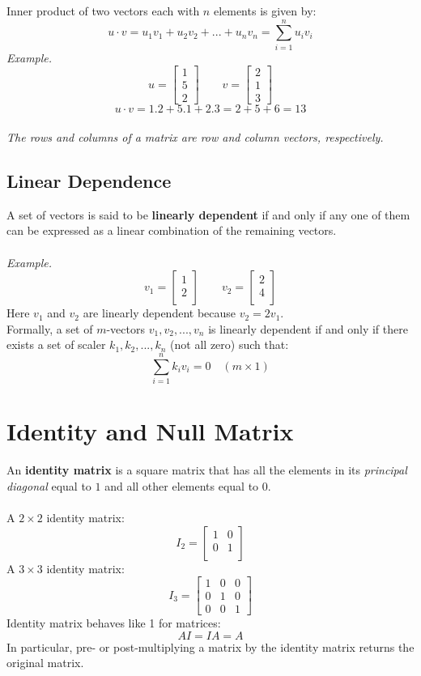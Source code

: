 \documentclass{./../Latex/handout}
\begin{document}
Inner product of two vectors each with $n$ elements is given by:
$$ u \cdot v = u_1 v_1 + u_2 v_2 +...+ u_n v_n = \sum_{i=1}^n u_i v_i $$ 
\textit{Example.} $$u = \begin{bmatrix} 1 \\ 5 \\ 2 \end{bmatrix} \quad \quad v = \begin{bmatrix} 2 \\ 1 \\ 3 \end{bmatrix}$$
$$ u \cdot v = 1.2 + 5.1 + 2.3 = 2+5+6=13 $$ \\
\textit{The rows and columns of a matrix are row and column vectors, respectively.}  

\subsection{Linear Dependence}

A set of vectors is said to be \textbf{linearly dependent} if and only if any one of them can be expressed as a linear combination of the remaining vectors. \\~\\
\textit{Example.}$$ v_1 =  \begin{bmatrix}
1\\
2 \\
\end{bmatrix} \quad \quad v_2 = \begin{bmatrix}
2\\
4 \\
\end{bmatrix}$$
Here $v_1$ and $v_2$ are linearly dependent because $v_2=2 v_1$.\\

Formally, a set of $m$-vectors $v_1, v_2, ...,v_n$ is {linearly dependent} if and only if there exists a set of scaler $k_1, k_2, ..., k_n$ (not all zero) such that:
$$ \sum_{i=1}^n k_i v_i = 0 \quad (m \times 1) $$ 


\section{Identity and Null Matrix}
An \textbf{identity matrix} is a square matrix that has all the elements in its \textit{principal diagonal} equal to $1$ and all other elements equal to $0$. \\~\\
A $2 \times 2$ identity matrix:
$$ I_2 = \begin{bmatrix}
1 & 0\\
0 & 1 \\
\end{bmatrix}$$
A $3 \times 3$ identity matrix:
$$ I_3 = \begin{bmatrix}
1 & 0 & 0 \\
0 & 1 & 0\\
0 & 0 & 1
\end{bmatrix}$$
Identity matrix behaves like 1 for matrices:
$$ AI = IA = A $$ 
In particular, pre- or post-multiplying a matrix by the identity matrix returns the original matrix.
\end{document}
